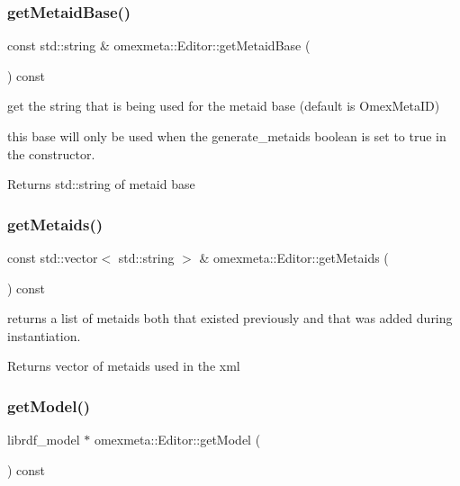 \subsubsection{\texorpdfstring{get\+Metaid\+Base()}{getMetaidBase()}}
{\footnotesize\ttfamily const std\+::string \& omexmeta\+::\+Editor\+::get\+Metaid\+Base (\begin{DoxyParamCaption}{ }\end{DoxyParamCaption}) const}



get the string that is being used for the metaid base (default is Omex\+Meta\+ID) 

this base will only be used when the generate\+\_\+metaids boolean is set to true in the constructor. \begin{DoxyReturn}{Returns}
std\+::string of metaid base 
\end{DoxyReturn}
\mbox{\label{classomexmeta_1_1Editor_a242c86222e1aeff337d3af22641db1de}} 
\subsubsection{\texorpdfstring{get\+Metaids()}{getMetaids()}}
{\footnotesize\ttfamily const std\+::vector$<$ std\+::string $>$ \& omexmeta\+::\+Editor\+::get\+Metaids (\begin{DoxyParamCaption}{ }\end{DoxyParamCaption}) const}



returns a list of metaids both that existed previously and that was added during instantiation. 

\begin{DoxyReturn}{Returns}
vector of metaids used in the xml 
\end{DoxyReturn}
\mbox{\label{classomexmeta_1_1Editor_a4b2610fb802eb306349d69ae6fde60c0}} 
\subsubsection{\texorpdfstring{get\+Model()}{getModel()}}
{\footnotesize\ttfamily librdf\+\_\+model $\ast$ omexmeta\+::\+Editor\+::get\+Model (\begin{DoxyParamCaption}{ }\end{DoxyParamCaption}) const}



